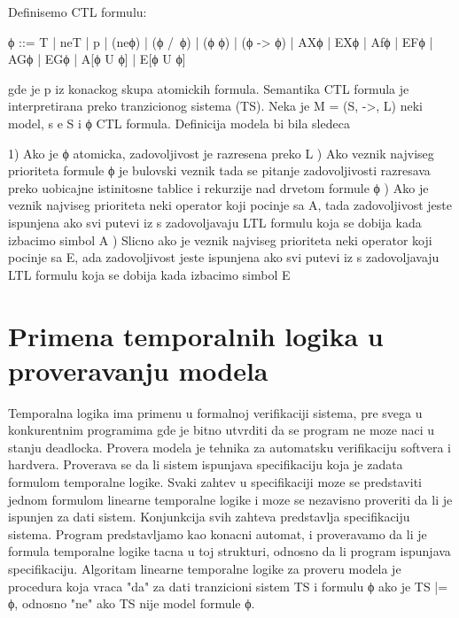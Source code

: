 \documentclass[a4paper]{article}
\begin{document}
Definisemo CTL formulu:

ϕ ::= T | neT | p | (neϕ) | (ϕ /\ ϕ) | (ϕ \/ ϕ) | (ϕ -> ϕ) | AXϕ | EXϕ | Afϕ | EFϕ | AGϕ | EGϕ | A[ϕ U ϕ] | E[ϕ U ϕ]

gde je p iz konackog skupa atomickih formula.
\newline
\newline
Semantika
\newline
\newline
CTL formula je interpretirana preko tranzicionog sistema (TS). Neka je M = (S, ->, L) neki model, s e S i ϕ CTL formula.
Definicija modela bi bila sledeca

	1) Ako je ϕ atomicka, zadovoljivost je razresena preko L ) Ako veznik najviseg prioriteta formule ϕ je bulovski veznik tada se pitanje zadovoljivosti razresava
	   preko uobicajne istinitosne tablice i rekurzije nad drvetom formule ϕ ) Ako je veznik najviseg prioriteta neki operator koji pocinje sa A, tada zadovoljivost jeste ispunjena ako
	   svi putevi iz s zadovoljavaju LTL formulu koja se dobija kada izbacimo simbol A ) Slicno ako je veznik najviseg prioriteta neki operator koji pocinje sa E, ada zadovoljivost jeste ispunjena ako
	   svi putevi iz s zadovoljavaju LTL formulu koja se dobija kada izbacimo simbol E \newline

\newpage

\section{Primena temporalnih logika u proveravanju modela}
\label{sec:MC}

Temporalna logika ima primenu u formalnoj verifikaciji sistema, pre svega u konkurentnim programima gde je bitno utvrditi da se program ne moze naci u stanju deadlocka. 
Provera modela je tehnika za automatsku verifikaciju softvera i hardvera. Proverava se da li sistem ispunjava specifikaciju koja je zadata formulom temporalne logike. 
Svaki zahtev u specifikaciji moze se predstaviti jednom formulom linearne temporalne logike i moze se nezavisno proveriti da li je ispunjen za dati sistem. Konjunkcija svih zahteva predstavlja specifikaciju sistema.
Program predstavljamo kao konacni automat, i proveravamo da li je formula temporalne logike tacna u toj strukturi, odnosno da li program ispunjava specifikaciju.
Algoritam linearne temporalne logike za proveru modela je procedura koja vraca "da" za dati tranzicioni sistem TS i formulu ϕ ako je TS |= ϕ, odnosno "ne" ako TS nije model formule ϕ.
\end{document}
